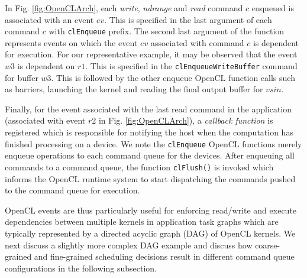 	\par In Fig. \ref{fig:OpenCLArch}, each \textit{write}, \textit{ndrange} and \textit{read} command $c$ enqueued is associated with an event $ev$. This is specified in the last argument of each command $c$ with {\tt clEnqueue} prefix. The second last argument of the function represents events on which the event $ev$ associated with command $c$ is dependent for execution. For our representative example, it may be observed that the event $w3$ is dependent on $r1$. This is specified in the {\tt clEnqueueWriteBuffer} command for buffer $w3$. This is followed by the other enqueue OpenCL function calls such as barriers,   launching the kernel and reading the final output buffer for $vsin$.   
	\par Finally, for the event associated with the last read command in the application (associated with event $r2$ in Fig. \ref{fig:OpenCLArch}), a \textit{callback function} is registered which is responsible for notifying the host when the computation has finished processing on a device. We note the {\tt clEnqueue} OpenCL functions merely enqueue operations to each command queue for the devices. After enqueuing all commands to a command queue, the function {\tt clFlush()} is invoked which informs the OpenCL runtime system to start dispatching the commands pushed to the command queue for execution.  
	\par OpenCL events are thus particularly useful for enforcing read/write and execute dependencies between multiple kernels in application task graphs which are typically represented by a directed acyclic graph (DAG) of OpenCL kernels.  %
	We next discuss a slightly more complex DAG example and discuss how  coarse-grained and  fine-grained scheduling decisions result in different command queue configurations in the following subsection. 


